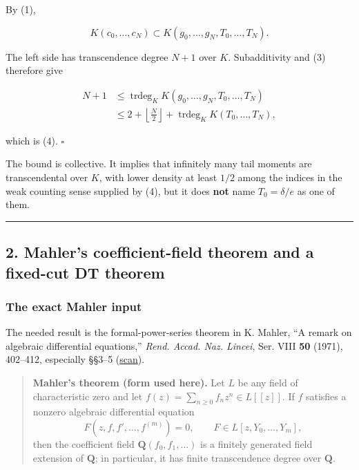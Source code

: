 By (1),

\[
 K(c_0,\ldots,c_N)\subset
 K(g_0,\ldots,g_N,T_0,\ldots,T_N).
\]

The left side has transcendence degree \(N+1\) over \(K\). Subadditivity
and (3) therefore give

\[
\begin{aligned}
N+1
&\le \operatorname{trdeg}_K K(g_0,\ldots,g_N,T_0,\ldots,T_N)\\
&\le 2+\left\lfloor\frac N2\right\rfloor
 +\operatorname{trdeg}_K K(T_0,\ldots,T_N),
\end{aligned}
\]

which is (4). \(\square\)

The bound is collective. It implies that infinitely many tail moments are
transcendental over \(K\), with lower density at least \(1/2\) among the
indices in the weak counting sense supplied by (4), but it does \textbf{not} name
\(T_0=\delta/e\) as one of them.

\begin{center}\rule{0.5\linewidth}{0.5pt}\end{center}

\subsection{2. Mahler's coefficient-field theorem and a fixed-cut DT theorem}

\subsubsection{The exact Mahler input}

The needed result is the formal-power-series theorem in K. Mahler,
``A remark on algebraic differential equations,'' \emph{Rend. Accad. Naz. Lincei},
Ser. VIII \textbf{50} (1971), 402--412, especially §§3--5
(\href{https://carmamaths.org/resources/mahler/docs/176.pdf}{scan}).

\begin{quote}
\textbf{Mahler's theorem (form used here).} Let \(L\) be any field of
characteristic zero and let \(f(z)=\sum_{n\ge0}f_nz^n\in L[[z]]\). If
\(f\) satisfies a nonzero algebraic differential equation
\[
F(z,f,f',\ldots,f^{(m)})=0,
\qquad F\in L[z,Y_0,\ldots,Y_m],
\]
then the coefficient field \(\mathbf Q(f_0,f_1,\ldots)\) is a finitely
generated field extension of \(\mathbf Q\); in particular, it has finite
transcendence degree over \(\mathbf Q\).
\end{quote}

